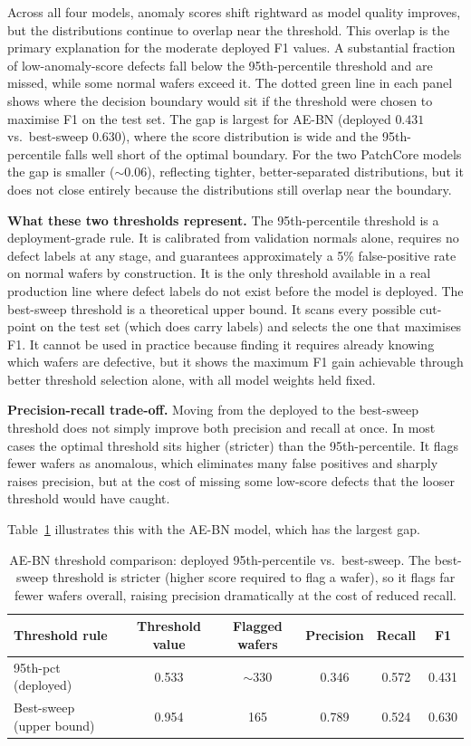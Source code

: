 \documentclass[11pt]{article}
\begin{document}
Across all four models, anomaly scores shift rightward as model quality improves, but the distributions continue to overlap near the threshold.
This overlap is the primary explanation for the moderate deployed F1 values. A substantial fraction of low-anomaly-score defects fall below the 95th-percentile threshold and are missed, while some normal wafers exceed it.
The dotted green line in each panel shows where the decision boundary would sit if the threshold were chosen to maximise F1 on the test set.
The gap is largest for AE-BN (deployed $0.431$ vs.\ best-sweep $0.630$), where the score distribution is wide and the 95th-percentile falls well short of the optimal boundary.
For the two PatchCore models the gap is smaller (${\sim}0.06$), reflecting tighter, better-separated distributions, but it does not close entirely because the distributions still overlap near the boundary.

\textbf{What these two thresholds represent.}
The 95th-percentile threshold is a deployment-grade rule. It is calibrated from validation normals alone, requires no defect labels at any stage, and guarantees approximately a 5\% false-positive rate on normal wafers by construction.
It is the only threshold available in a real production line where defect labels do not exist before the model is deployed.
The best-sweep threshold is a theoretical upper bound. It scans every possible cut-point on the test set (which does carry labels) and selects the one that maximises F1.
It cannot be used in practice because finding it requires already knowing which wafers are defective, but it shows the maximum F1 gain achievable through better threshold selection alone, with all model weights held fixed.

\textbf{Precision-recall trade-off.} Moving from the deployed to the best-sweep threshold does not simply improve both precision and recall at once. In most cases the optimal threshold sits higher (stricter) than the 95th-percentile. It flags fewer wafers as anomalous, which eliminates many false positives and sharply raises precision, but at the cost of missing some low-score defects that the looser threshold would have caught.

Table~\ref{tab:threshold_comparison} illustrates this with the AE-BN model, which has the largest gap.

\begin{table}[H]
\centering
\caption{AE-BN threshold comparison: deployed 95th-percentile vs.\ best-sweep.
The best-sweep threshold is stricter (higher score required to flag a wafer),
so it flags far fewer wafers overall, raising precision dramatically at the
cost of reduced recall.}
\label{tab:threshold_comparison}
\begin{tabular}{lccccc}
\toprule
Threshold rule & Threshold value & Flagged wafers & Precision & Recall & F1 \\
\midrule
95th-pct (deployed) & 0.533 & ${\sim}330$ & 0.346 & 0.572 & 0.431 \\
Best-sweep (upper bound) & 0.954 & 165          & 0.789 & 0.524 & 0.630 \\
\bottomrule
\end{tabular}
\end{table}
\end{document}
